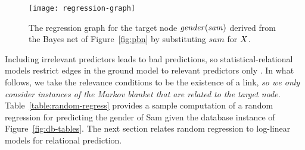 \documentclass[twoside,leqno,twocolumn]{article}
\begin{document}
\begin{figure}
\begin{center}
\texttt{[image: regression-graph]}
\caption{%
The regression graph for the target node $\it{gender}(sam)$ derived from the Bayes net of Figure~\ref{fig:pbn} by substituting $sam$ for $X$.
 \label{fig:regress}}
\end{center}
\end{figure}



Including irrelevant predictors leads to bad predictions, so statistical-relational models restrict edges in the ground model to relevant predictors only \cite{Poole2003}. %
In what follows, we take the relevance conditions to be the existence of a link, {\em so we only consider instances of the Markov blanket that are related to the target node.} Table~\ref{table:random-regress} provides a sample computation of a random regression for predicting the gender of Sam given the database instance of Figure~\ref{fig:db-tables}. 
The next section relates random regression to log-linear models for relational prediction.
\end{document}
